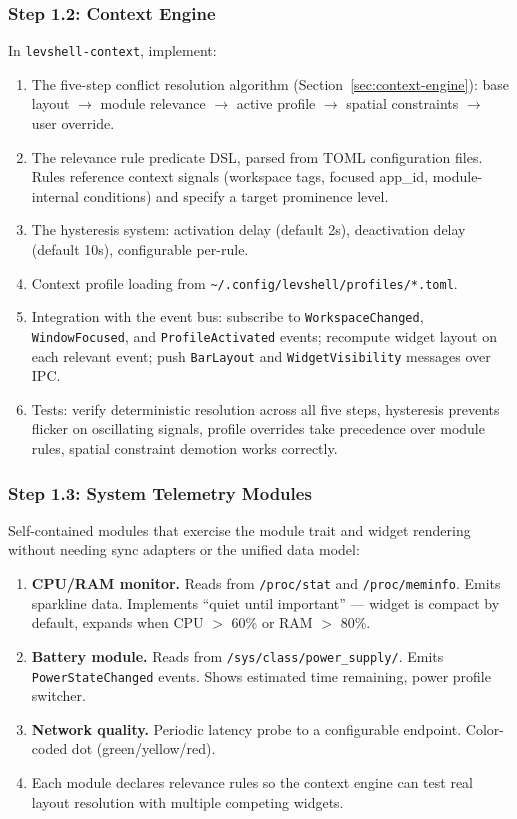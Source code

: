 \documentclass[11pt,a4paper]{article}
\begin{document}
\subsubsection{Step 1.2: Context Engine}

In \texttt{levshell-context}, implement:

\begin{enumerate}[leftmargin=1.5em, itemsep=2pt]
  \item The five-step conflict resolution algorithm (Section~\ref{sec:context-engine}): base layout $\to$ module relevance $\to$ active profile $\to$ spatial constraints $\to$ user override.
  \item The relevance rule predicate DSL, parsed from TOML configuration files. Rules reference context signals (workspace tags, focused app\_id, module-internal conditions) and specify a target prominence level.
  \item The hysteresis system: activation delay (default 2s), deactivation delay (default 10s), configurable per-rule.
  \item Context profile loading from \texttt{\textasciitilde/.config/levshell/profiles/*.toml}.
  \item Integration with the event bus: subscribe to \texttt{WorkspaceChanged}, \texttt{WindowFocused}, and \texttt{ProfileActivated} events; recompute widget layout on each relevant event; push \texttt{BarLayout} and \texttt{WidgetVisibility} messages over IPC.
  \item Tests: verify deterministic resolution across all five steps, hysteresis prevents flicker on oscillating signals, profile overrides take precedence over module rules, spatial constraint demotion works correctly.
\end{enumerate}

\subsubsection{Step 1.3: System Telemetry Modules}

Self-contained modules that exercise the module trait and widget rendering without needing sync adapters or the unified data model:

\begin{enumerate}[leftmargin=1.5em, itemsep=2pt]
  \item \textbf{CPU/RAM monitor.} Reads from \texttt{/proc/stat} and \texttt{/proc/meminfo}. Emits sparkline data. Implements ``quiet until important'' --- widget is compact by default, expands when CPU $>$ 60\% or RAM $>$ 80\%.
  \item \textbf{Battery module.} Reads from \texttt{/sys/class/power\_supply/}. Emits \texttt{PowerStateChanged} events. Shows estimated time remaining, power profile switcher.
  \item \textbf{Network quality.} Periodic latency probe to a configurable endpoint. Color-coded dot (green/yellow/red).
  \item Each module declares relevance rules so the context engine can test real layout resolution with multiple competing widgets.
\end{enumerate}
\end{document}
